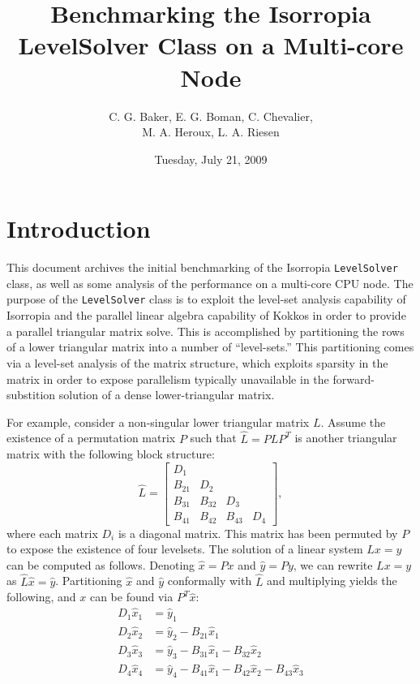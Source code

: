 \documentclass[12pt]{article}
\begin{document}
\title{Benchmarking the Isorropia LevelSolver Class on a Multi-core Node}
\author{C. G. Baker, E. G. Boman, C. Chevalier, \\ M. A. Heroux, L. A. Riesen}
\date{Tuesday, July 21, 2009}
\maketitle

\section{Introduction}

This document archives the initial benchmarking of the Isorropia \texttt{LevelSolver} class, as well as some analysis of the performance on a multi-core CPU node. The purpose of the \texttt{LevelSolver} class is to exploit the level-set analysis capability of Isorropia and the parallel linear algebra capability of Kokkos in order to provide a parallel triangular matrix solve. This is accomplished by partitioning the rows of a lower triangular matrix into a number of ``level-sets.'' This partitioning comes via a level-set analysis of the matrix structure, which exploits sparsity in the matrix in order to expose parallelism typically unavailable in the forward-substition solution of a dense lower-triangular matrix.

For example, consider a non-singular lower triangular matrix $L$. Assume the existence of a permutation matrix $P$ such that $\hat{L} = P L P^T$ is another triangular matrix with the following block structure:
\[
\hat{L} = \begin{bmatrix} D_1    &               &             & \\
                     B_{21} & D_2     &             & \\
                B_{31} & B_{32} & D_3     & \\
                 B_{41} & B_{42} & B_{43} & D_4
       \end{bmatrix}, 
\]
where each matrix $D_i$ is a diagonal matrix. This matrix has been permuted by $P$ to expose the existence of four levelsets. The solution of a linear system $L x = y$ can be computed as follows. Denoting $\hat{x} = P x$ and $\hat{y} = P y$, we can rewrite $L x = y$ as $\hat{L} \hat{x} = \hat{y}$. Partitioning $\hat{x}$ and $\hat{y}$ conformally with $\hat{L}$ and multiplying yields the following, and $x$ can be found via $P^T \hat{x}$:
\begin{align*}
D_1 \hat{x}_1 &= \hat{y}_1 \\
D_2 \hat{x}_2 &=  \hat{y}_2 - B_{21} \hat{x}_1 \\
D_3 \hat{x}_3 &= \hat{y}_3 - B_{31} \hat{x}_1 - B_{32} \hat{x}_2 \\
D_4 \hat{x}_4 &= \hat{y}_4 - B_{41} \hat{x}_1 - B_{42} \hat{x}_2 - B_{43} \hat{x}_3 
\end{align*}
\end{document}
